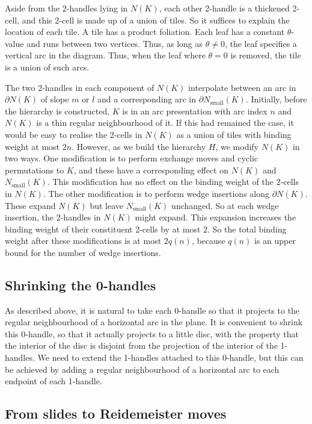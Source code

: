 \documentclass[oneside]{amsart}
\numberwithin{equation}{section}
\theoremstyle{plain}
\theoremstyle{definition}
\begin{document}
Aside from the 2-handles lying in $N(K)$, each other 2-handle is a thickened 2-cell, and this 2-cell is 
made up of a union of tiles. So it suffices to explain the location of each tile.
A tile has a product foliation. Each leaf has a constant $\theta$-value and runs between two vertices.
Thus, as long as $\theta \not= 0$, the leaf specifies a vertical arc in the diagram. Thus, when the leaf
where $\theta = 0$ is removed, the tile is a union of such arcs.

The two 2-handles in each component of $N(K)$ interpolate between an arc in $\partial N(K)$ of slope $m$ or $l$
and a corresponding arc in $\partial N_{\textrm{small}}(K)$. Initially, before the hierarchy is constructed,
$K$ is in an arc presentation with arc index $n$ and $N(K)$ is a thin regular neighbourhood of it.
If this had remained the case, it would be easy to realise the 2-cells in $N(K)$ as a union of tiles
with binding weight at most $2n$. However, as we build the hierarchy $H$, we modify $N(K)$ in two ways.
One modification is to perform exchange moves and cyclic permutations to $K$, and these have a corresponding
effect on $N(K)$ and $N_{\textrm{small}}(K)$. This modification has no effect on the binding weight of
the 2-cells in $N(K)$. The other modification is to perform wedge insertions along $\partial N(K)$.
These expand $N(K)$ but leave $N_{\textrm{small}}(K)$ unchanged. So at each wedge insertion,
the 2-handles in $N(K)$ might expand. This expansion increases the binding weight of their constituent
2-cells by at most $2$. So the total binding weight after these modifications is at most $2q(n)$, because
$q(n)$ is an upper bound for the number of wedge insertions.


\subsection{Shrinking the 0-handles}

As described above, it is natural to take each 0-handle so that it projects to the regular neighbourhood of
a horizontal arc in the plane. It is convenient to shrink this 0-handle, so that it actually projects to a little disc,
with the property that the interior of the disc is disjoint from the projection of the interior of the 1-handles.
We need to extend the 1-handles attached to this 0-handle, but this can be achieved by adding a regular
neighbourhood of a horizontal arc to each endpoint of each 1-handle.

\subsection{From slides to Reidemeister moves}
\label{Subsec:SlidesToRMs}
\end{document}
